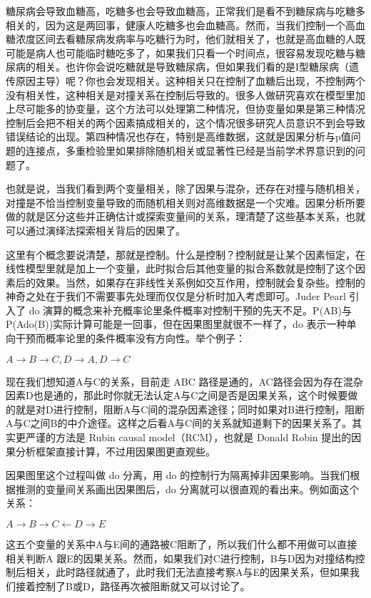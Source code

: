 \documentclass[]{tufte-book}
\begin{document}
糖尿病会导致血糖高，吃糖多也会导致血糖高，正常我们是看不到糖尿病与吃糖多相关的，因为这是两回事，健康人吃糖多也会血糖高。然而，当我们控制一个高血糖浓度区间去看糖尿病发病率与吃糖行为时，他们就相关了，也就是高血糖的人既可能是病人也可能临时糖吃多了，如果我们只看一个时间点，很容易发现吃糖与糖尿病的相关。也许你会说吃糖就是导致糖尿病，但如果我们看的是I型糖尿病（遗传原因主导）呢？你也会发现相关。这种相关只在控制了血糖后出现，不控制两个没有相关性，这种相关是对撞关系在控制后导致的。很多人做研究喜欢在模型里加上尽可能多的协变量，这个方法可以处理第二种情况，但协变量如果是第三种情况控制后会把不相关的两个因素搞成相关的，这个情况很多研究人员意识不到会导致错误结论的出现。第四种情况也存在，特别是高维数据，这就是因果分析与p值问题的连接点，多重检验里如果排除随机相关或显著性已经是当前学术界意识到的问题了。

也就是说，当我们看到两个变量相关，除了因果与混杂，还存在对撞与随机相关，对撞是不恰当控制变量导致的而随机相关则对高维数据是一个灾难。因果分析所要做的就是区分这些并正确估计或探索变量间的关系，理清楚了这些基本关系，也就可以通过演绎法探索相关背后的因果了。

这里有个概念要说清楚，那就是控制。什么是控制？控制就是让某个因素恒定，在线性模型里就是加上一个变量，此时拟合后其他变量的拟合系数就是控制了这个因素后的效果。当然，如果存在非线性关系例如交互作用，控制就会复杂些。控制的神奇之处在于我们不需要事先处理而仅仅是分析时加入考虑即可。Juder Pearl 引入了 do 演算的概念来补充概率论里条件概率对控制干预的先天不足。P(A\textbar B)与P(A\textbar do(B))实际计算可能是一回事，但在因果图里就很不一样了，do 表示一种单向干预而概率论里的条件概率没有方向性。举个例子：

\(A \rightarrow B \rightarrow C, D\rightarrow A, D\rightarrow C\)

现在我们想知道A与C的关系，目前走 ABC 路径是通的，AC路径会因为存在混杂因素D也是通的，那此时你就无法认定A与C之间是否是因果关系，这个时候要做的就是对D进行控制，阻断A与C间的混杂因素途径；同时如果对B进行控制，阻断A与C之间B的中介途径。这样之后看A与C间的关系就知道剩下的因果关系了。其实更严谨的方法是 Rubin causal model（RCM），也就是 Donald Robin 提出的因果分析框架直接计算，不过用因果图更直观些。

因果图里这个过程叫做 do 分离，用 do 的控制行为隔离掉非因果影响。当我们根据推测的变量间关系画出因果图后，do 分离就可以很直观的看出来。例如面这个关系：

\(A \rightarrow B \rightarrow C \leftarrow D \rightarrow E\)

这五个变量的关系中A与E间的通路被C阻断了，所以我们什么都不用做可以直接相关判断A 跟E的因果关系。然而，如果我们对C进行控制，B与D因为对撞结构控制后相关，此时路径就通了，此时我们无法直接考察A与E的因果关系，但如果我们接着控制了B或D，路径再次被阻断就又可以讨论了。
\end{document}

